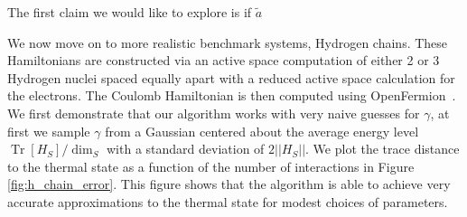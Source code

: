 \documentclass{article}
\newcommand{\brackets}[1]{\left[ #1 \right]}
\newcommand{\norm}[1]{\left|\left| #1 \right|\right|}
\DeclareMathOperator{\Tr}{Tr}
\newcommand{\trace}[1]{\Tr \brackets{ #1 }}
\begin{document}

The first claim we would like to explore is if $\tilde{a}$

We now move on to more realistic benchmark systems, Hydrogen chains. These Hamiltonians are constructed via an active space computation of either 2 or 3 Hydrogen nuclei spaced equally apart with a reduced active space calculation for the electrons. The Coulomb Hamiltonian is then computed using OpenFermion~\cite{mcclean2020openfermion}. We first demonstrate that our algorithm works with very naive guesses for $\gamma$, at first we sample $\gamma$ from a Gaussian centered about the average energy level $\trace{H_S} / \dim_S$ with a standard deviation of $2 \norm{H_S}$. We plot the trace distance to the thermal state as a function of the number of interactions in Figure \ref{fig:h_chain_error}. This figure shows that the algorithm is able to achieve very accurate approximations to the thermal state for modest choices of parameters. 
\end{document}
